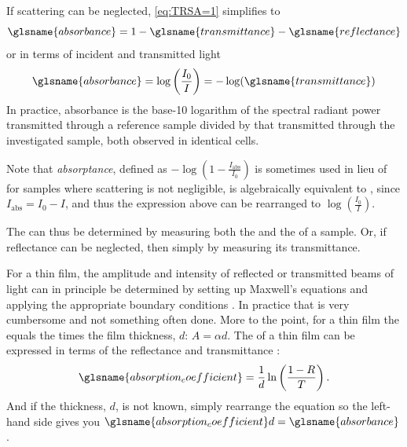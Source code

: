 \documentclass[webedition,openright,titles,swedish,english]{LuaUUThesis}\usepackage[]{graphicx}\usepackage[]{xcolor}
\def\x{0}}]%
\let\x=\pgfmathresult}]%
\def\rnd{.%
\pdfuniformdeviate10%
\pdfuniformdeviate10%
\pdfuniformdeviate10%
}
\begin{document}
{
}
If scattering can be neglected, \cref{eq:TRSA=1} simplifies to
\begin{equation}
\glsname{absorbance} = 1  - \glsname{transmittance} - \glsname{reflectance}
\end{equation}
or in terms of incident and transmitted light
\begin{equation}
\glsname{absorbance} =
\log\left(\frac{I_0}{I}\right) =
-\log(\glsname{transmittance})
\end{equation}
In practice, \gls{absorbance} is the base-10 logarithm of the spectral radiant power
transmitted through a reference sample divided by that
transmitted through the investigated sample, both observed in identical cells.

Note that \emph{absorptance}, defined as $-\log(1-\frac{I_\text{abs}}{I_0})$ \cite{Cohen2008}
is sometimes used in lieu of  for samples where scattering
is not negligible, is algebraically equivalent to , since
$I_\mathrm{abs} = I_0 - I$, and thus the expression above can be rearranged
to $\log\left(\frac{I_0}{I}\right)$.

The  can thus be determined by measuring both the 
and the  of a sample. Or, if reflectance can be neglected, then simply
by measuring its transmittance.

For a thin film, the amplitude and intensity of reflected or transmitted beams
of light can in principle be determined by setting up Maxwell's equations
and applying the appropriate boundary conditions \cite{Heavens1955}.
In practice that is very cumbersome and not something often done.
More to the point, for a thin film the  equals the
 times the film thickness, $d$: $A=\alpha d$.
The  of a thin film can be expressed in terms
of the reflectance and transmittance \cite{Green2012}:
\begin{equation}\label{eq:alpha-thickness}
\glsname{absorption_coefficient} = \frac{1}{d}\ln\left(\frac{1-R}{T}\right).
\end{equation}
And if the thickness, $d$, is not known, simply rearrange the equation so the
left-hand side gives you $\glsname{absorption_coefficient}d = \glsname{absorbance}$.
\end{document}
